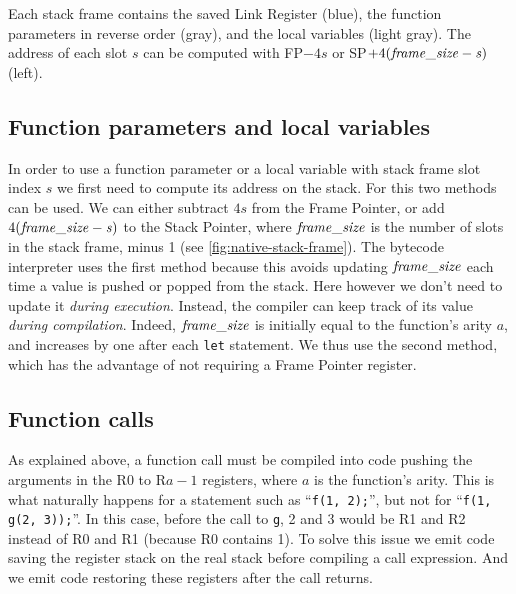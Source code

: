 \begin{Figure}
  

  \caption{Each stack frame contains the saved Link Register (blue), the
  function parameters in reverse order (gray), and the local variables (light
  gray). The address of each slot $s$ can be computed with FP$-4s$ or
  SP$+4(\it{frame\_size}-s)$ (left).}\label{fig:native-stack-frame}
\end{Figure}

\subsection{Function parameters and local
variables}\label{subsection:frame-size}

In order to use a function parameter or a local variable with stack frame slot
index $s$ we first need to compute its address on the stack. For this two
methods can be used. We can either subtract $4s$ from the Frame Pointer, or add
$4(\it{frame\_size}-s)$ to the Stack Pointer, where $\it{frame\_size}$ is the
number of slots in the stack frame, minus 1 (see
\cref{fig:native-stack-frame}). The bytecode interpreter uses the first method
because this avoids updating $\it{frame\_size}$ each time a value is pushed or
popped from the stack. Here however we don't need to update it {\em during
execution}. Instead, the compiler can keep track of its value {\em during
compilation}. Indeed, $\it{frame\_size}$ is initially equal to the function's
arity $a$, and increases by one after each {\tt let} statement. We thus use the
second method, which has the advantage of not requiring a Frame Pointer
register.

\subsection{Function calls}\label{subsection:native-fn-call}

As explained above, a function call must be compiled into code pushing the
arguments in the R0 to R$a-1$ registers, where $a$ is the function's arity.
This is what naturally happens for a statement such as ``{\tt f(1, 2);}'', but
not for ``{\tt f(1, g(2, 3));}''. In this case, before the call to {\tt g},
2 and 3 would be R1 and R2 instead of R0 and R1 (because R0 contains 1). To
solve this issue we emit code saving the register stack on the real stack
before compiling a call expression. And we emit code restoring these registers
after the call returns.

